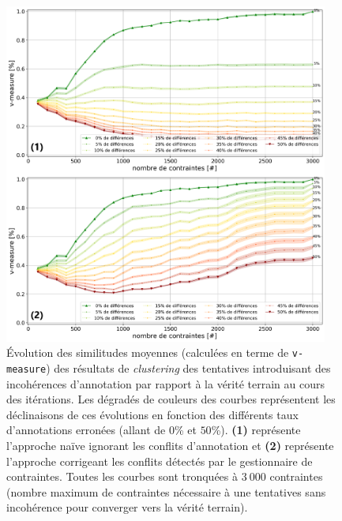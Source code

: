 			\begin{figure}[!htb]
				\centering
				\includegraphics[width=0.95\textwidth]{figures/etude-erreur-simulation-impact-closest}
				\caption{
					Évolution des similitudes moyennes (calculées en terme de \texttt{v-measure}) des résultats de \textit{clustering} des tentatives introduisant des incohérences d'annotation par rapport à la vérité terrain au cours des itérations.
					Les dégradés de couleurs des courbes représentent les déclinaisons de ces évolutions en fonction des différents taux d'annotations erronées (allant de $0$\% et $50$\%).
					\textbf{(1)} représente l'approche naïve ignorant les conflits d'annotation
					et \textbf{(2)} représente l'approche corrigeant les conflits détectés par le gestionnaire de contraintes.
					Toutes les courbes sont tronquées à $3~000$ contraintes (nombre maximum de contraintes nécessaire à une tentatives sans incohérence pour converger vers la vérité terrain).
				}
				\label{figure:4.6.1-ETUDE-ROBUSTESSE-INTERETS-CORRECTION-INCOHERENCES}
			\end{figure}
			
